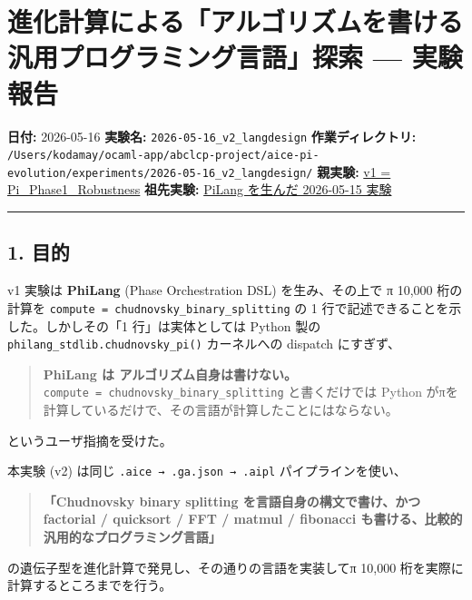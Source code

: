 \documentclass[
]{ltjsarticle}
\author{}
\date{}
\begin{document}
{
\setcounter{tocdepth}{2}
\tableofcontents
}
\section{進化計算による「アルゴリズムを書ける汎用プログラミング言語」探索
---
実験報告}\label{ux9032ux5316ux8a08ux7b97ux306bux3088ux308bux30a2ux30ebux30b4ux30eaux30baux30e0ux3092ux66f8ux3051ux308bux6c4eux7528ux30d7ux30edux30b0ux30e9ux30dfux30f3ux30b0ux8a00ux8a9eux63a2ux7d22-ux5b9fux9a13ux5831ux544a}

\textbf{日付:} 2026-05-16 \textbf{実験名:}
\texttt{2026-05-16\_v2\_langdesign} \textbf{作業ディレクトリ:}
\texttt{/Users/kodamay/ocaml-app/abclcp-project/aice-pi-evolution/experiments/2026-05-16\_v2\_langdesign/}
\textbf{親実験:} \href{../2026-05-16_robustness_v1/REPORT.md}{v1 =
Pi\_Phase1\_Robustness} \textbf{祖先実験:}
\href{../../REPORT_JA.md}{PiLang を生んだ 2026-05-15 実験}

\begin{center}\rule{0.5\linewidth}{0.5pt}\end{center}

\subsection{1. 目的}\label{ux76eeux7684}

v1 実験は \textbf{PhiLang} (Phase Orchestration DSL) を生み、その上で π
10,000 桁の計算を \texttt{compute\ =\ chudnovsky\_binary\_splitting} の
1 行で記述できることを示した。しかしその「1 行」は実体としては Python
製の \texttt{philang\_stdlib.chudnovsky\_pi()} カーネルへの dispatch
にすぎず、

\begin{quote}
\textbf{PhiLang は アルゴリズム自身は書けない。}
\texttt{compute\ =\ chudnovsky\_binary\_splitting} と書くだけでは Python
がπを計算しているだけで、その言語が計算したことにはならない。
\end{quote}

というユーザ指摘を受けた。

本実験 (v2) は同じ \texttt{.aice\ →\ .ga.json\ →\ .aipl}
パイプラインを使い、

\begin{quote}
\textbf{「Chudnovsky binary splitting を言語自身の構文で書け、かつ
factorial / quicksort / FFT / matmul / fibonacci
も書ける、比較的汎用的なプログラミング言語」}
\end{quote}

の遺伝子型を進化計算で発見し、その通りの言語を実装してπ 10,000
桁を実際に計算するところまでを行う。
\end{document}
